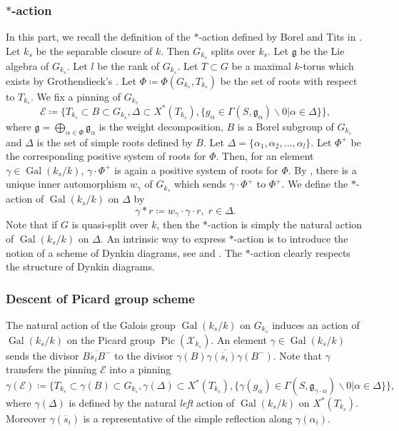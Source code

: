 \documentclass[11pt, reqno]{amsart}
\theoremstyle{plain}
\theoremstyle{definition}
\DeclareMathOperator{\Gal}{Gal}
\DeclareMathOperator{\Pic}{Pic}    %
\begin{document}
\subsubsection{$\ast$-action} In this part, we recall the definition of the $\ast$-action defined by Borel and Tits in \cite[\S~6.2]{BorelTits}.
Let $k_s$ be the separable closure of $k$. Then $G_{k_s}$ splits over $k_s$. Let $\mathfrak{g}$ be the Lie algebra of $G_{k_s}$. Let $l$ be the rank of $G_{k_s}$. Let $T\subset G$ be a maximal $k$-torus which exists by Grothendieck's \cite[exposé~XIV, théorème~1.1]{SGA3II}. Let $\Phi\coloneq \Phi(G_{k_s},T_{k_s})$ be the set of roots with respect to $T_{k_s}$. We fix a pinning of $G_{k_s}$ 
$$\mathcal{E}\coloneq \{T_{k_s}\subset B \subset G_{k_s}, \Delta\subset X^*(T_{k_s}), \{g_{\alpha}\in \Gamma (S,\mathfrak{g}_{\alpha})\backslash 0\vert\alpha\in\Delta\}\},$$
where $\mathfrak{g}= \bigoplus_{\alpha\in\Phi}\mathfrak{g}_{\alpha}$ is the weight decomposition, $B$ is a Borel subgroup of $G_{k_s}$ and $\Delta$ is the set of simple roots defined by $B$. Let $\Delta=\{\alpha_1, \alpha_2,...,\alpha_l\}$. Let $\Phi^+$ be the corresponding positive system of roots for $\Phi$. Then, for an element $\gamma\in \Gal(k_s/k)$, $\gamma\cdot \Phi^+$ is again a positive system of roots for $\Phi$. By \cite[exposé~XXIV, lemme~1.5]{SGA3III}, there is a unique inner automorphism $w_{\gamma}$ of $G_{k_s}$ which sends $\gamma\cdot \Phi^+$ to $\Phi^+$. We define the $\ast$-action of $\Gal(k_s/k)$ on $\Delta$ by 
$$\gamma\ast r\coloneq w_{\gamma}\cdot \gamma\cdot r,\; r\in\Delta.$$
Note that if $G$ is quasi-split over $k$, then the $\ast$-action is simply the natural action of $\Gal(k_s/k)$ on $\Delta$. An intrinsic way to express $\ast$-action is to introduce the notion of a scheme of Dynkin diagrams, see \cite[Remark~7.1.2]{redctiveconrad} and \cite[exposé~XXIV, \S~3]{SGA3III}. The $\ast$-action clearly respects the structure of Dynkin diagrams.


\subsubsection{Descent of Picard group scheme}
The natural action of the Galois group $\Gal(k_s/k)$ on $G_{k_s}$ induces an action of $\Gal(k_s/k)$ on the Picard group $\Pic(\mathcal{X}_{k_s})$. An element $\gamma\in \Gal(k_s/k)$ sends the divisor $\overline{B\dot{s_i}B^-}$ to the divisor $\overline{\gamma(B)\gamma(\dot{s_i})\gamma(B^-)}$. Note that $\gamma$ transfers the pinning $\mathcal{E}$ into a pinning 
$$\gamma(\mathcal{E})\coloneq \{T_{k_s}\subset \gamma(B) \subset G_{k_s}, \gamma(\Delta)\subset X^*(T_{k_s}), \{\gamma(g_{\alpha})\in \Gamma (S,\mathfrak{g}_{\gamma\cdot\alpha})\backslash 0\vert \alpha\in\Delta \}\},$$
where $\gamma(\Delta)$ is defined by the natural \emph{left} action of $\Gal(k_s/k)$ on $X^*(T_{k_s})$. Moreover $\gamma(\dot{s_i})$ is a representative of the simple reflection along $\gamma(\alpha_i)$.
\end{document}
